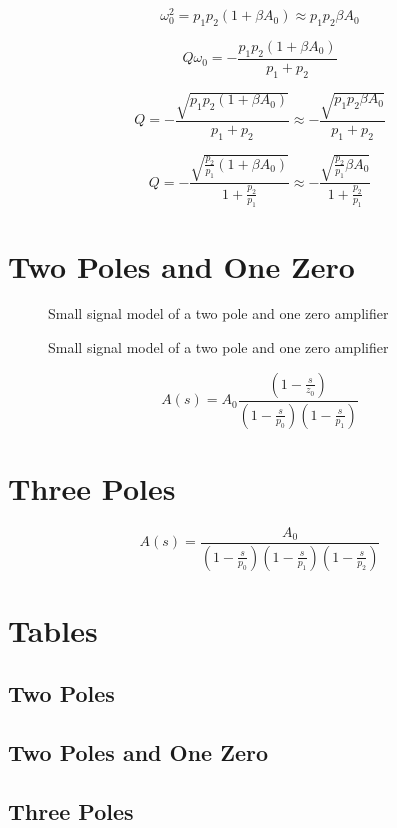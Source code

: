 \documentclass{article}[11pt]
\begin{document}
\begin{equation}
  \omega_0^2 = p_1 p_2 (1+\beta A_0) \approx p_1 p_2 \beta A_0
\end{equation}

\begin{equation}
  Q \omega_0 = -\frac{p_1 p_2 (1+\beta A_0)}{p_1+p_2}
\end{equation}

\begin{equation}
  Q  = -\frac{\sqrt{p_1 p_2 (1+\beta A_0)}}{p_1+p_2} \approx -\frac{\sqrt{p_1 p_2 \beta A_0}}{p_1+p_2}
\end{equation}

\begin{equation}
  Q  = -\frac{\sqrt{\frac{p_2}{p_1} (1+\beta A_0)}}{1+\frac{p_2}{p_1}} \approx -\frac{\sqrt{\frac{p_2}{p_1} \beta A_0}}{1+\frac{p_2}{p_1}}
\end{equation}


\section{Two Poles and One Zero}

\begin{figure}[h]
  \centering
  \begin{circuitikz}[scale=0.95]
    
  \end{circuitikz}
  \caption{Small signal model of a two pole and one zero amplifier}
  \label{fig:plot}
\end{figure}

\begin{figure}[h]
  \centering
  \begin{circuitikz}[scale=0.95]
    
  \end{circuitikz}
  \caption{Small signal model of a two pole and one zero amplifier}
  \label{fig:plot}
\end{figure}


\begin{equation}
  A(s) = A_0 \frac{\left(1-\frac{s}{z_0}\right)}{\left(1-\frac{s}{p_0}\right)\left(1-\frac{s}{p_1}\right)}
\end{equation}

\section{Three Poles}

\begin{equation}
  A(s) = \frac{A_0}{\left(1-\frac{s}{p_0}\right)\left(1-\frac{s}{p_1}\right)\left(1-\frac{s}{p_2}\right)}
\end{equation}

\printbibliography

\appendix
\section{Tables}

\subsection{Two Poles}
\subsection{Two Poles and One Zero}
\subsection{Three Poles}
\end{document}
